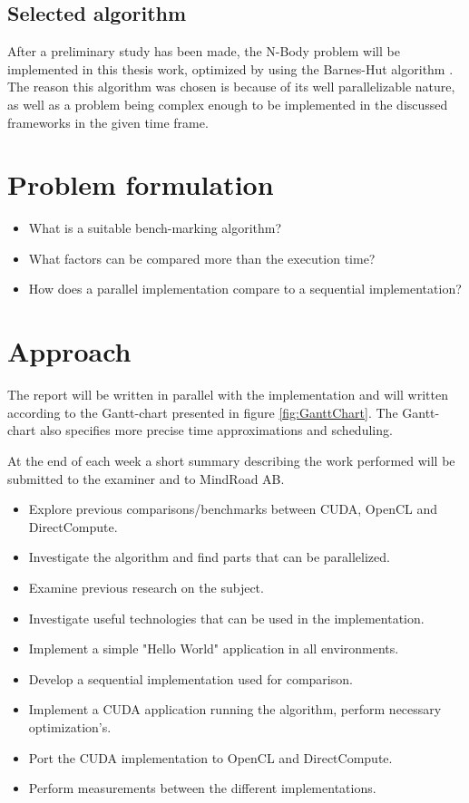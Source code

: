 \documentclass{article}
\begin{document}
\subsection{Selected algorithm}
After a preliminary study has been made, the N-Body problem will be implemented in this thesis work, optimized by using the Barnes-Hut algorithm \cite{barnes1986hierarchical}. The reason this algorithm was chosen is because of its well parallelizable nature, as well as a problem being complex enough to be implemented in the discussed frameworks in the given time frame.

\section{Problem formulation}
\begin{itemize}
    \item What is a suitable bench-marking algorithm?
    \item What factors can be compared more than the execution time?
    \item How does a parallel implementation compare to a sequential implementation?
\end{itemize}


\section{Approach}
The report will be written in parallel with the implementation and will written according to the Gantt-chart presented in figure \ref{fig:GanttChart}. The Gantt-chart also specifies more precise time approximations and scheduling.

At the end of each week a short summary describing the work performed will be submitted to the examiner and to MindRoad AB.

\begin{itemize}
    \item Explore previous comparisons/benchmarks between CUDA, OpenCL and DirectCompute. 
    \item Investigate the algorithm and find parts that can be parallelized.
    \item Examine previous research on the subject.
    \item Investigate useful technologies that can be used in the implementation.
    \item Implement a simple "Hello World" application in all environments.
    \item Develop a sequential implementation used for comparison.
    \item Implement a CUDA application running the algorithm, perform necessary optimization's.
    \item Port the CUDA implementation to OpenCL and DirectCompute.
    \item Perform measurements between the different implementations.
\end{itemize}
\end{document}

